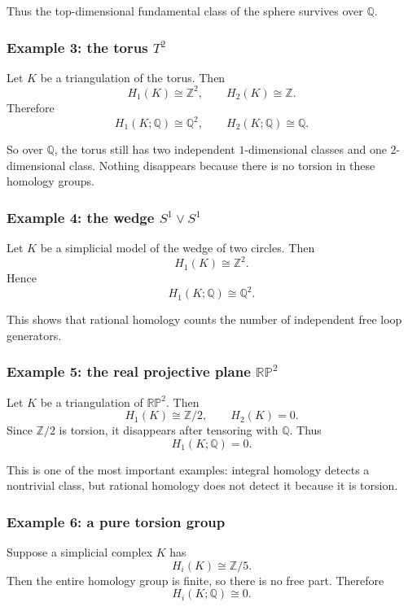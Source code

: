 \documentclass[12pt,a4paper]{article}
\theoremstyle{notespace}
\begin{document}
Thus the top-dimensional fundamental class of the sphere survives over \(\mathbb Q\).

\subsubsection*{Example 3: the torus \(T^2\)}

Let \(K\) be a triangulation of the torus. Then
\[
H_1(K)\cong \mathbb Z^2,
\qquad
H_2(K)\cong \mathbb Z.
\]
Therefore
\[
H_1(K;\mathbb Q)\cong \mathbb Q^2,
\qquad
H_2(K;\mathbb Q)\cong \mathbb Q.
\]

So over \(\mathbb Q\), the torus still has two independent \(1\)-dimensional classes and one \(2\)-dimensional class. Nothing disappears because there is no torsion in these homology groups.

\subsubsection*{Example 4: the wedge \(S^1\vee S^1\)}

Let \(K\) be a simplicial model of the wedge of two circles. Then
\[
H_1(K)\cong \mathbb Z^2.
\]
Hence
\[
H_1(K;\mathbb Q)\cong \mathbb Q^2.
\]

This shows that rational homology counts the number of independent free loop generators.

\subsubsection*{Example 5: the real projective plane \(\mathbb{RP}^2\)}

Let \(K\) be a triangulation of \(\mathbb{RP}^2\). Then
\[
H_1(K)\cong \mathbb Z/2,
\qquad
H_2(K)=0.
\]
Since \(\mathbb Z/2\) is torsion, it disappears after tensoring with \(\mathbb Q\). Thus
\[
H_1(K;\mathbb Q)=0.
\]

This is one of the most important examples: integral homology detects a nontrivial class, but rational homology does not detect it because it is torsion.

\subsubsection*{Example 6: a pure torsion group}

Suppose a simplicial complex \(K\) has
\[
H_i(K)\cong \mathbb Z/5.
\]
Then the entire homology group is finite, so there is no free part. Therefore
\[
H_i(K;\mathbb Q)\cong 0.
\]
\end{document}
